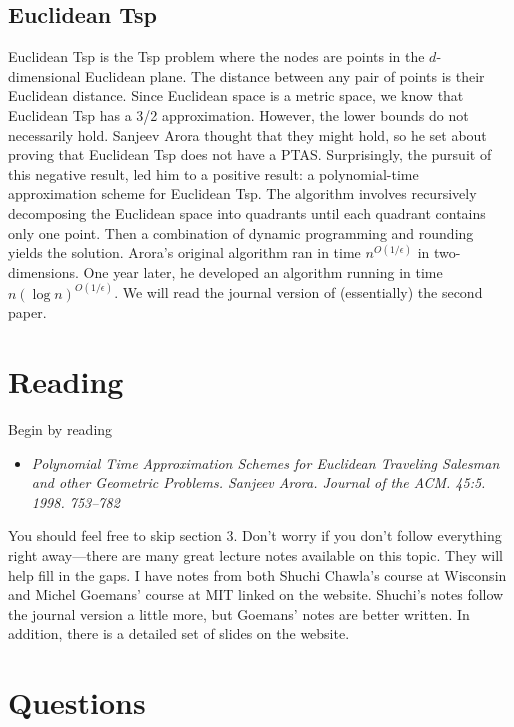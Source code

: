 \documentclass[11pt]{article}
\newcommand{\TSP}{{\sc Tsp}\xspace}
\begin{document}
\subsection{Euclidean \TSP}

Euclidean \TSP is the \TSP problem where the nodes are points in the $d$-dimensional Euclidean plane.  The distance between any pair of points is their Euclidean distance.  Since Euclidean space is a metric space, we know that Euclidean \TSP has a 3/2 approximation.  However, the lower bounds do not necessarily hold.  Sanjeev Arora thought that they might hold, so he set about proving that Euclidean \TSP does not have a PTAS.  Surprisingly, the pursuit of this negative result, led him to a positive result:  a polynomial-time approximation scheme for Euclidean \TSP.  The algorithm involves recursively decomposing the Euclidean space into quadrants until each quadrant contains only one point.  Then a combination of dynamic programming and rounding yields the solution.  Arora's original algorithm ran in time $n^{O(1/\epsilon)}$ in two-dimensions.  One year later, he developed an algorithm running in time $n(\log n)^{O(1/\epsilon)}$.  We will read the journal version of (essentially) the second paper.

\section{Reading}

Begin by reading

\begin{itemize}
	\item [] {\em Polynomial Time Approximation Schemes for Euclidean Traveling Salesman and other Geometric Problems.  Sanjeev Arora.  Journal of the ACM.  45:5.  1998.  753--782}
\end{itemize}

\noindent You should feel free to skip section 3.  Don't worry if you don't follow everything right away---there are many great lecture notes available on this topic.  They will help fill in the gaps.  I have notes from both Shuchi Chawla's course at Wisconsin and Michel Goemans' course at MIT linked on the website.  Shuchi's notes follow the journal version a little more, but Goemans' notes are better written.  In addition, there is a detailed set of slides on the website.

\section{Questions}
\end{document}
